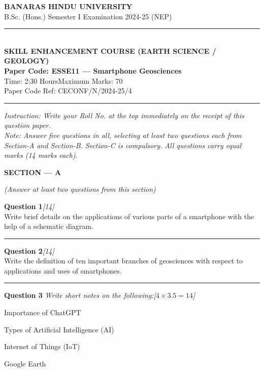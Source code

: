 \documentclass[11pt,a4paper]{article}
\newcommand{\pts}[1]{\hfill   \textit{[#1]}}
\begin{document}
\begin{center}
  {\large\bfseries BANARAS HINDU UNIVERSITY}\\[2pt]
  {\normalsize B.Sc. (Hons.) Semester I Examination 2024-25 (NEP)}\\[6pt]
  \rule{0.8\linewidth}{0.5pt}\\[6pt]
  {\large\bfseries SKILL ENHANCEMENT COURSE (EARTH SCIENCE / GEOLOGY)}\\[4pt]
  {\large\bfseries Paper Code: ESSE11 --- Smartphone Geosciences}\\[4pt]
  {\normalsize Time: 2:30 Hours\hfill Maximum Marks: 70}\\[2pt]
  {\small Paper Code Ref: CECONF/N/2024-25/4}
\end{center}

\rule{\linewidth}{0.4pt}\smallskip



\noindent   \textit{Instruction: Write your Roll No. at the top immediately on the receipt of this question paper.}\\[2pt]



\noindent   \textit{Note: Answer five questions in all, selecting at least two questions each from Section-A and Section-B. Section-C is compulsory. All questions carry equal marks (14 marks each).}
\bigskip


\begin{center}
   \textbf{\large SECTION --- A}
\end{center}
   \textit{(Answer at least two questions from this section)}
\bigskip




\noindent   \textbf{Question 1}\pts{14} \\
Write brief details on the applications of various parts of a smartphone with the help of a schematic diagram.

\medskip\rule{\linewidth}{0.2pt}\medskip




\noindent   \textbf{Question 2}\pts{14} \\
Write the definition of ten important branches of geosciences with respect to applications and uses of smartphones.

\medskip\rule{\linewidth}{0.2pt}\medskip




\noindent   \textbf{Question 3}   \textit{Write short notes on the following:}\pts{$4  \times 3.5 = 14$}

\begin{parts}
  \item Importance of ChatGPT
  \item Types of Artificial Intelligence (AI)
  \item Internet of Things (IoT)
  \item Google Earth
\end{parts}
\end{document}
